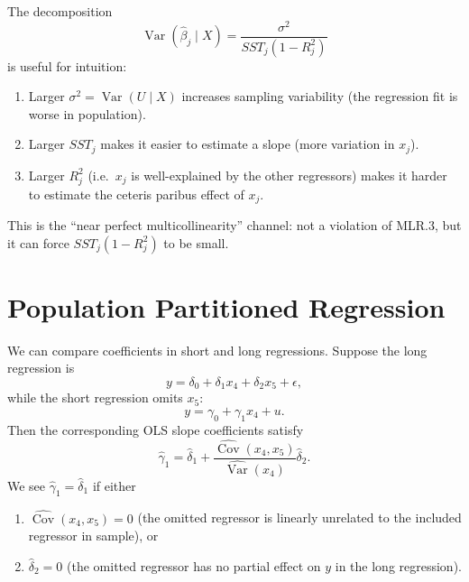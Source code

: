 \begin{remark}
	The decomposition
	\[
		\operatorname{Var}(\hat{\beta}_j\mid X)=\frac{\sigma^2}{SST_j(1-R_j^2)}
	\]
	is useful for intuition:
	\begin{enumerate}[label=(\roman*)]
		\item Larger $\sigma^2=\operatorname{Var}(U\mid X)$ increases sampling variability (the regression fit is worse in population).
		\item Larger $SST_j$ makes it easier to estimate a slope (more variation in $x_j$).
		\item Larger $R_j^2$ (i.e.\ $x_j$ is well-explained by the other regressors) makes it harder to estimate the ceteris paribus effect of $x_j$.
	\end{enumerate}
	This is the ``near perfect multicollinearity'' channel: not a violation of MLR.3, but it can force $SST_j(1-R_j^2)$ to be small.
\end{remark}


\section{Population Partitioned Regression}\label{sec:pop-partitioned-reg}

We can compare coefficients in short and long regressions.
Suppose the long regression is
\[
	y = \delta_0 + \delta_1 x_4 + \delta_2 x_5 + \epsilon,
\]
while the short regression omits $x_5$:
\[
	y = \gamma_0 + \gamma_1 x_4 + u.
\]
Then the corresponding OLS slope coefficients satisfy
\[
	\hat{\gamma}_1 = \hat{\delta}_1 + \frac{\widehat{\operatorname{Cov}}(x_4,x_5)}{\widehat{\operatorname{Var}}(x_4)}\hat{\delta}_2.
\]
We see $\hat{\gamma}_1=\hat{\delta}_1$ if either
\begin{enumerate}[label=(\roman*)]
	\item $\widehat{\operatorname{Cov}}(x_4,x_5)=0$ (the omitted regressor is linearly unrelated to the included regressor in sample), or
	\item $\hat{\delta}_2=0$ (the omitted regressor has no partial effect on $y$ in the long regression).
\end{enumerate}

